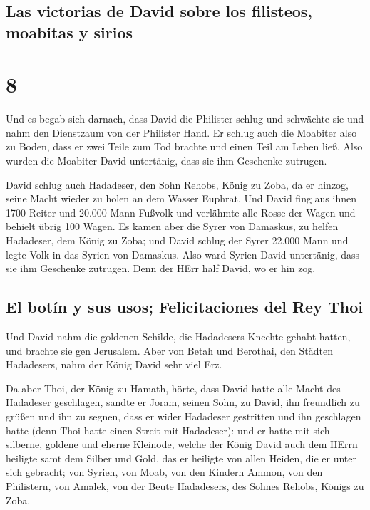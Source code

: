 \hypertarget{las-victorias-de-david-sobre-los-filisteos-moabitas-y-sirios}{%
\subsection{Las victorias de David sobre los filisteos, moabitas y
sirios}\label{las-victorias-de-david-sobre-los-filisteos-moabitas-y-sirios}}

\hypertarget{section-7}{%
\section{8}\label{section-7}}

 Und es begab sich darnach, dass David die Philister
schlug und schwächte sie und nahm den Dienstzaum von der Philister Hand.
 Er schlug auch die Moabiter also zu Boden, dass er zwei
Teile zum Tod brachte und einen Teil am Leben ließ. Also wurden die
Moabiter David untertänig, dass sie ihm Geschenke zutrugen.

 David schlug auch Hadadeser, den Sohn Rehobs, König zu
Zoba, da er hinzog, seine Macht wieder zu holen an dem Wasser Euphrat.
 Und David fing aus ihnen 1700 Reiter und 20.000 Mann
Fußvolk und verlähmte alle Rosse der Wagen und behielt übrig 100 Wagen.
 Es kamen aber die Syrer von Damaskus, zu helfen
Hadadeser, dem König zu Zoba; und David schlug der Syrer 22.000 Mann
 und legte Volk in das Syrien von Damaskus. Also ward
Syrien David untertänig, dass sie ihm Geschenke zutrugen. Denn der HErr
half David, wo er hin zog.

\hypertarget{el-botuxedn-y-sus-usos-felicitaciones-del-rey-thoi}{%
\subsection{El botín y sus usos; Felicitaciones del Rey
Thoi}\label{el-botuxedn-y-sus-usos-felicitaciones-del-rey-thoi}}

 Und David nahm die goldenen Schilde, die Hadadesers
Knechte gehabt hatten, und brachte sie gen Jerusalem. 
Aber von Betah und Berothai, den Städten Hadadesers, nahm der König
David sehr viel Erz.

 Da aber Thoi, der König zu Hamath, hörte, dass David
hatte alle Macht des Hadadeser geschlagen,  sandte er
Joram, seinen Sohn, zu David, ihn freundlich zu grüßen und ihn zu
segnen, dass er wider Hadadeser gestritten und ihn geschlagen hatte
(denn Thoi hatte einen Streit mit Hadadeser): und er hatte mit sich
silberne, goldene und eherne Kleinode,  welche der König
David auch dem HErrn heiligte samt dem Silber und Gold, das er heiligte
von allen Heiden, die er unter sich gebracht;  von
Syrien, von Moab, von den Kindern Ammon, von den Philistern, von Amalek,
von der Beute Hadadesers, des Sohnes Rehobs, Königs zu Zoba.

